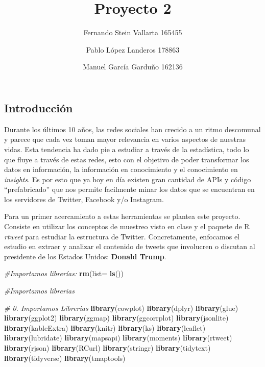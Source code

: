 \documentclass[
]{article}
\title{Proyecto 2}
\author{Fernando Stein Vallarta 165455 \and Pablo López Landeros 178863 \and Manuel García Garduño 162136}
\date{}
\newenvironment{Shaded}{\begin{snugshade}}{\end{snugshade}}
\newcommand{\CommentTok}[1]{\textcolor[rgb]{0.56,0.35,0.01}{\textit{#1}}}
\newcommand{\DataTypeTok}[1]{\textcolor[rgb]{0.13,0.29,0.53}{#1}}
\newcommand{\KeywordTok}[1]{\textcolor[rgb]{0.13,0.29,0.53}{\textbf{#1}}}
\newcommand{\NormalTok}[1]{#1}
\begin{document}
\maketitle

\hypertarget{introducciuxf3n}{%
\subsection{Introducción}\label{introducciuxf3n}}

Durante los últimos 10 años, las redes sociales han crecido a un ritmo
descomunal y parece que cada vez toman mayor relevancia en varios
aspectos de nuestras vidas. Esta tendencia ha dado pie a estudiar a
través de la estadística, todo lo que fluye a través de estas redes,
esto con el objetivo de poder transformar los datos en información, la
información en conocimiento y el conocimiento en \emph{insights}. Es por
esto que ya hoy en día existen gran cantidad de APIs y código
``prefabricado'' que nos permite facilmente minar los datos que se
encuentran en los servidores de Twitter, Facebook y/o Instagram.

Para un primer acercamiento a estas herramientas se plantea este
proyecto. Consiste en utilizar los conceptos de muestreo visto en clase
y el paquete de R \emph{rtweet} para estudiar la estructura de Twitter.
Concretamente, enfocamos el estudio en extraer y analizar el contenido
de tweets que involucren o discutan al presidente de los Estados Unidos:
\textbf{Donald Trump}.

\begin{Shaded}
\begin{Highlighting}[]
\CommentTok{#Importamos librerías:}
\KeywordTok{rm}\NormalTok{(}\DataTypeTok{list=} \KeywordTok{ls}\NormalTok{())}

\CommentTok{#Importamos librerias}

\CommentTok{# 0. Importamos Librerias}
\KeywordTok{library}\NormalTok{(cowplot)}
\KeywordTok{library}\NormalTok{(dplyr) }
\KeywordTok{library}\NormalTok{(glue)}
\KeywordTok{library}\NormalTok{(ggplot2)}
\KeywordTok{library}\NormalTok{(ggmap)}
\KeywordTok{library}\NormalTok{(ggcorrplot)}
\KeywordTok{library}\NormalTok{(jsonlite)}
\KeywordTok{library}\NormalTok{(kableExtra)}
\KeywordTok{library}\NormalTok{(knitr)}
\KeywordTok{library}\NormalTok{(ks)}
\KeywordTok{library}\NormalTok{(leaflet)}
\KeywordTok{library}\NormalTok{(lubridate)}
\KeywordTok{library}\NormalTok{(mapsapi)}
\KeywordTok{library}\NormalTok{(moments) }
\KeywordTok{library}\NormalTok{(rtweet)}
\KeywordTok{library}\NormalTok{(rjson)}
\KeywordTok{library}\NormalTok{(RCurl)}
\KeywordTok{library}\NormalTok{(stringr)}
\KeywordTok{library}\NormalTok{(tidytext)}
\KeywordTok{library}\NormalTok{(tidyverse) }
\KeywordTok{library}\NormalTok{(tmaptools)}
\end{Highlighting}
\end{Shaded}
\end{document}
